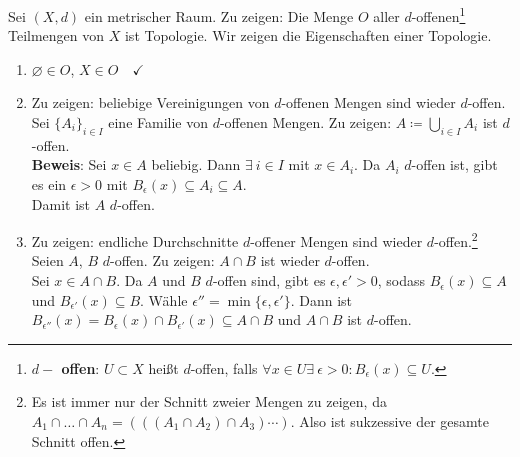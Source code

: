 \begin{problem*}[1]
  Sei $ (X, d) $ ein metrischer Raum. Zu zeigen: Die Menge $ O $ aller $ d $-offenen\footnote{\textbf{$ d- $ offen}: $ U \subset X $ heißt $ d $-offen, falls $ \forall x \in U \exists \ \epsilon > 0 : B_\epsilon(x) \subseteq U $.} Teilmengen von $ X $ ist Topologie. Wir zeigen die Eigenschaften einer Topologie.
  \begin{enumerate}
    \item $ \varnothing \in O $, $ X \in O \quad \checkmark $
    \item Zu zeigen: beliebige Vereinigungen von $ d $-offenen Mengen sind wieder $ d $-offen. \\
      Sei $ \{ A_i \}_{ i \in I } $ eine Familie von $ d $-offenen Mengen. Zu zeigen: $ A \coloneqq \bigcup_{i \in I}A_i $ ist $ d $-offen. \\
      \textbf{Beweis}: Sei $ x \in A $ beliebig. Dann $ \exists \ i \in I $ mit $ x \in A_i $. Da $ A_i $ $ d $-offen ist, gibt es ein $ \epsilon > 0 $ mit $ B_\epsilon(x) \subseteq A_i \subseteq A $. \\
      Damit ist $ A $ $ d $-offen.
    \item Zu zeigen: endliche Durchschnitte $ d $-offener Mengen sind wieder $ d $-offen.\footnote{Es ist immer nur der Schnitt zweier Mengen zu zeigen, da $ A_1 \cap \dots \cap A_n = \left( \left( \left( A_1 \cap A_2 \right) \cap A_3 \right) \cdots \right) $. Also ist sukzessive der gesamte Schnitt offen.} \\
    Seien $ A $, $ B $ $ d $-offen. Zu zeigen: $ A \cap B $ ist wieder $ d $-offen. \\
    Sei $ x \in A \cap B $. Da $ A $ und $ B $ $ d $-offen sind, gibt es $ \epsilon, \epsilon' > 0 $, sodass $ B_\epsilon(x) \subseteq A $ und $ B_{\epsilon'}(x) \subseteq B $. Wähle $ \epsilon'' = \min\{ \epsilon, \epsilon' \} $. Dann ist $ B_{\epsilon''}(x) = B_\epsilon(x) \cap B_{\epsilon'}(x) \subseteq A \cap B $ und $ A \cap B $ ist $ d $-offen.
  \end{enumerate}
\end{problem*}

